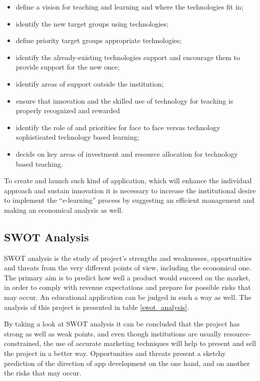 \begin{itemize}
  \item define a vision for teaching and learning and where the technologies fit in;
  \item identify the new target groups using technologies;
  \item define priority target groups appropriate technologies;
  \item identify the already-existing technologies support and encourage them to provide support for the new once;
  \item identify areas of support outside the institution;
  \item ensure that innovation and the skilled use of technology for teaching is properly recognized and rewarded
  \item identify the role of and priorities for face to face versus technology sophisticated technology     based learning;
  \item decide on key areas of investment and resource allocation for technology based teaching.
\end{itemize}

To create and launch such kind of application, which will enhance the individual approach and sustain innovation it is necessary to increase the institutional desire to implement the “e-learning” process by suggesting an efficient management and making an economical analysis as well.

\subsection{SWOT Analysis}
SWOT analysis is the study of project’s strengths and weaknesses, opportunities and threats from the very different points of view, including the economical one. The primary aim is to predict how well a product would succeed on the market, in order to comply with revenue expectations and prepare for possible risks that may occur. An educational application can be judged in such a way as well. The analysis of this project is presented in table \ref{swot_analysis}.

By taking a look at SWOT analysis it can be concluded that the project has strong as well as      weak points, and even though institutions are usually resource-constrained, the use of accurate marketing techniques will help to present and sell the project in a better way. Opportunities and threats present a sketchy prediction of the direction of app development on the one hand, and on another the risks that may occur.


